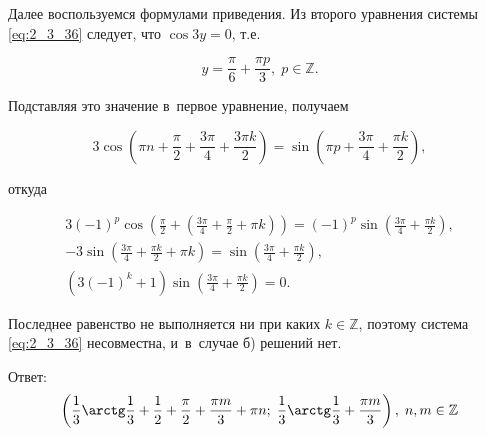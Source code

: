 \begin{itemize}
\noindent
Далее воспользуемся формулами приведения. Из второго уравнения системы \eqref{eq:2_3_36}
следует, что $\cos 3y = 0$, т.е.\

\begin{equation}\label{eq:2_3_37}
\displaystyle y = \frac{\pi}{6} + \frac{\pi p}{3}, \; p \in \mathbb{Z}.
\end{equation}

\noindent
Подставляя это значение в~первое уравнение, получаем

\begin{equation*}
3 \cos 
\left(
\pi n + \frac{\pi}{2} + \frac{3 \pi}{4} + \frac{3 \pi k}{2}
\right) = 
\sin
\left(
\pi p + \frac{3 \pi}{4} + \frac{\pi k}{2} 
\right),
\end{equation*}

\noindent
откуда

\begin{gather*}
\displaystyle 3(-1)^{p} \cos
\left(
\frac{\pi}{2} + \left( \frac{3\pi}{4} + \frac{\pi}{2} + \pi k
\right)\right) =
(-1)^{p} \sin \left( \frac{3\pi}{4} + \frac{\pi k}{2} \right), \\
\displaystyle -3 \sin \left( \frac{3\pi}{4} + \frac{\pi k}{2} + \pi k \right) =
\sin \left( \frac{3\pi}{4} + \frac{\pi k}{2} \right), \\
\displaystyle \left( 3(-1)^{k} + 1 \right) \sin \left( \frac{3 \pi}{4} + \frac{\pi k}{2} \right) = 0.
\end{gather*}

\noindent
Последнее равенство не выполняется ни при каких $k \in \mathbb{Z}$, поэтому
система \eqref{eq:2_3_36} несовместна, и~в~случае б) решений нет.

Ответ:
\begin{equation*}
\displaystyle \left(
\frac{1}{3} \arctg \frac{1}{3} + \frac{1}{2} + \frac{\pi}{2} + \frac{\pi m}{3} + \pi n; \;
\frac{1}{3} \arctg \frac{1}{3} + \frac{\pi m}{3}
\right), \;
n, m \in \mathbb{Z}
\end{equation*}
\end{itemize} 
